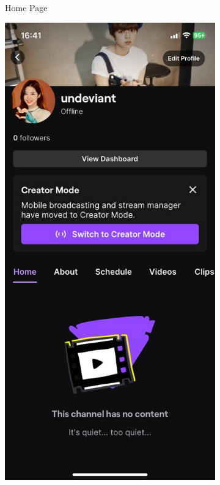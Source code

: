 \begin{figure} [h]
\begin{subfigure}{.3\linewidth}
      \caption{Home Page}
      \label{fig:myfig20}
    \end{subfigure}%
    \hspace{1em}%
    \begin{subfigure}{.3\linewidth}
      \centering
      \includegraphics[width = \linewidth]{mainmatter/images/twitch2.jpg}

\end{subfigure}
\end{figure}
